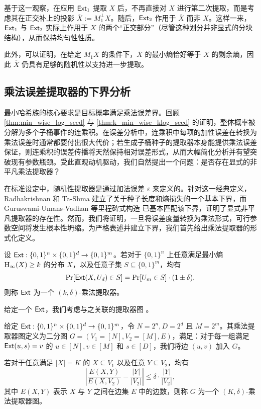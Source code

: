 基于这一观察，在应用 $\mathsf{Ext}_1$ 提取 $X$ 后，不再直接对 $X$ 进行第二次提取，而是考虑其在正交补上的投影 $\overline{X} := M_1^\bot X$。随后，$\mathsf{Ext}_2$ 作用于 $\overline{X}$ 而非 $X$。这样一来，$\mathsf{Ext}_1$ 与 $\mathsf{Ext}_2$ 实际上作用于 $X$ 的两个“正交部分”（尽管这种划分并非显式的分块结构），从而保持均匀性性质。

此外，可以证明，在给定 $M_1 X$ 的条件下，$\overline{X}$ 的最小熵恰好等于 $X$ 的剩余熵，因此 $\overline{X}$ 仍具有足够的随机性以支持进一步提取。

\subsection{乘法误差提取器的下界分析}\label{sec:lower_multi_ext}

最小哈希族的核心要求是目标概率满足乘法误差界。回顾 \cref{thm:min_wise_log_seed} 与 \cref{thm:k_min_wise_klog_seed} 的证明，整体概率被分解为多个子桶事件的连乘积。在误差分析中，连乘积中每项的加性误差在转换为乘法误差时通常都要付出很大代价；若生成子桶种子的提取器本身能提供乘法误差保证，则连乘积的误差传播将天然保持相对误差形式，从而大幅简化分析并有望突破现有参数瓶颈。受此直观动机驱动，我们自然提出一个问题：是否存在显式的非平凡乘法提取器？

在标准设定中，随机性提取器是通过加法误差 $\varepsilon$ 来定义的。针对这一经典定义，Radhakrishnan 和 Ta-Shma \cite{RT_siam00} 建立了关于种子长度和熵损失的一个基本下界，而 Guruswami-Umans-Vadhan 等里程碑式构造 \cite{GUV_extractor} 已基本匹配该下界，证明了显式非平凡提取器的存在性。然而，我们将证明，一旦将误差度量转换为乘法形式，可行参数空间将发生根本性坍缩。为严格表述并建立下界，我们首先给出乘法提取器的形式化定义。

\begin{definition}[乘法提取器]
    设 $\mathsf{Ext} : \{0,1\}^n \times \{0,1\}^d \to \{0,1\}^m$。若对于 $\{0,1\}^n$ 上任意满足最小熵 $\mathrm{H}_\infty(X)\ge k$ 的分布 $X$，以及任意子集 $S\subseteq\{0,1\}^m$，均有
    $$
    \Pr[\mathsf{Ext}(X, U_d) \in S] = \Pr[U_m \in S] \cdot (1 \pm \delta),
    $$
    则称 $\mathsf{Ext}$ 为一个 $(k,\delta)$-乘法提取器。
\end{definition}

给定一个 $\mathsf{Ext}$，我们考虑与之关联的提取器图 \cite{RT_siam00}。

\begin{definition}[乘法提取器图]
    给定 $\mathsf{Ext} : \{0, 1\}^n \times \{0, 1\}^d \to \{0, 1\}^m$，令 $N = 2^n, D = 2^d$ 且 $M = 2^m$。其乘法提取器图定义为二分图 $G = (V_1 = [N], V_2 = [M], E)$，满足：对于每一组满足 $\mathsf{Ext}(u, s) = v$ 的 $u \in [N], v \in [M]$ 和 $s \in [D]$，我们将边 $(u, v)$ 加入 $G$。
    
    若对于任意满足 $|X| = K$ 的 $X \subseteq V_1$ 以及任意 $Y \subseteq V_2$，均有
    $$
    \left| \frac{E(X,Y)}{E(X,V_2)}-\frac{|Y|}{|V_2|} \right| \le \delta \cdot \frac{|Y|}{|V_2|},
    $$
    其中 $E(X, Y)$ 表示 $X$ 与 $Y$ 之间在边集 $E$ 中的边数，则称 $G$ 为一个 $(K, \delta)$-乘法提取器图。
\end{definition}

